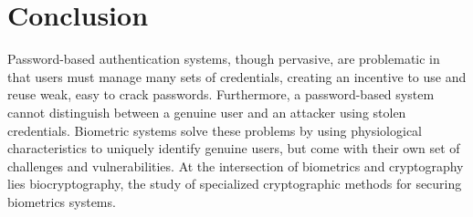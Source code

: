 \documentclass[11pt]{article}
\begin{document}
\section{Conclusion}
Password-based authentication systems, though pervasive, are problematic in
that users must manage many sets of credentials, creating an incentive to use
and reuse weak, easy to crack passwords. Furthermore, a password-based system
cannot distinguish between a genuine user and an attacker using stolen credentials. Biometric systems solve these problems by using physiological characteristics 
to uniquely identify genuine users, but come with their own set of challenges
and vulnerabilities. At the intersection of biometrics and cryptography 
lies biocryptography, the study of specialized cryptographic methods for 
securing biometrics systems. 


\singlespace
\nocite{*}

{}

\end{document}
